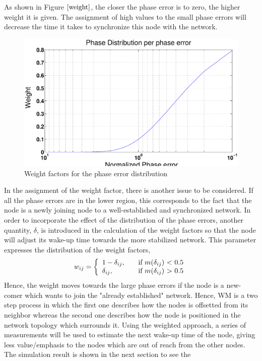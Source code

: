 \documentclass[a4paper,10pt]{report}
\begin{document}
\newline
As shown in Figure $\ref{weight}$, the closer the phase error is to zero, the higher weight it is given. The assignment of high
values to the small phase errors will decrease the time it takes to synchronize this node with the network.
\begin{figure}
\centering
\includegraphics[width= 0.6 \textwidth]{weight}
\caption{Weight factors for the phase error distribution}
\label{weight}
\end{figure}
\newline
In the assignment of the weight factor, there is another issue to be considered. If all the phase errors are in the lower region, this
corresponds to the fact that the node is a newly joining node to a well-established and synchronized network.  In order to incorporate the
effect of the distribution of the phase errors, another quantity, $\delta$, is introduced in the calculation of the weight factors so
that the node will adjust its wake-up time towards the more stabilized network. This parameter expresses the distribution of the
weight factors,
\[w_{ij} = \left\{
\begin{array}{l l}
  1 - \delta_{ij},& \quad \mbox{if $m(\delta_{ij}$) $<$ 0.5}\\
 \delta_{ij}, & \quad \mbox{if $m(\delta_{ij}$) $>$ 0.5}\\ \end{array} \right. \]
Hence, the weight moves towards the large phase errors if the node is a new-comer which wants to join the "already established"
network. 
\newline
Hence, WM is a two step process in which the first one describes how the nodes is offsetted from its neighbor whereas the second one describes how the node is positioned in the network topology which surrounds it.
\newline
Using the weighted approach, a series of measurements will be used to estimate the next wake-up time of the node, giving less
value/emphasis to the nodes which are out of reach from the other nodes. The simulation result is shown in the next section to see the
\end{document}
